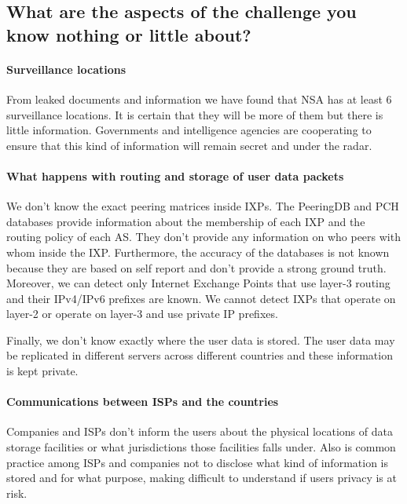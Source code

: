 \vspace{1cm}
\subsection{What are the aspects of the challenge you know nothing or little 
about?}
\vspace{0.7cm}

\paragraph{Surveillance locations\\}

From leaked documents and information we have found that NSA has at least 6 
surveillance locations. It is certain that they will be more of them but there 
is little information. Governments and intelligence agencies are cooperating to 
ensure that this kind of information will remain secret and under the radar.

\paragraph{What happens with routing and storage of user data packets\\}

We don't know the exact peering matrices inside IXPs. The PeeringDB and PCH 
databases provide information about the membership of each IXP and the routing 
policy of each AS. They don't provide any information on who peers with whom 
inside the IXP. Furthermore, the accuracy of the databases is not known because 
they are based on self report and don't provide a strong ground truth. Moreover, 
we can detect only Internet Exchange Points that use layer-3 routing and their 
IPv4/IPv6 prefixes are known. We cannot detect IXPs that operate on layer-2 or 
operate on layer-3 and use private IP prefixes. 

Finally, we don't know exactly where the user data is stored. The user data may 
be replicated in different servers across different countries and these 
information is kept private.

\paragraph{Communications between ISPs and the countries\\}
Companies and ISPs don't inform the users about the physical locations of data 
storage facilities or what jurisdictions those facilities falls under. Also is 
common practice among ISPs and companies not to disclose what kind of 
information is stored and for what purpose, making difficult to understand if 
users privacy is at risk.

